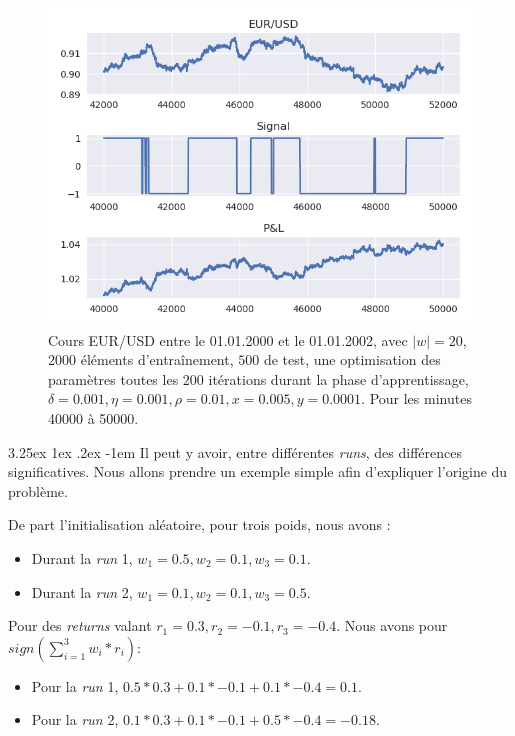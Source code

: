 \documentclass[a4paper, 11pt]{article}
\makeatletter
\renewcommand\paragraph{\@startsection{paragraph}{5}{\z@}%
  {3.25ex \@plus1ex \@minus.2ex}%
  {-1em}%
  {\normalfont\normalsize\bfseries}}
\makeatother
\begin{document}
 \begin{figure}[H]
	\centering
	\includegraphics[scale=0.85]{images/res/eursud_2000-2001_from_40000to_50000}
	\caption[Blup]{Cours EUR/USD entre le 01.01.2000 et le 01.01.2002, avec $|w| = 20$, $2000$ éléments d'entraînement, $500$ de test, une optimisation des
		paramètres toutes les $200$ itérations durant la phase d'apprentissage, $\delta = 0.001, \eta=0.001,\rho=0.01, x = 0.005, y=0.0001$. Pour les minutes 40000 à 50000.}
\end{figure}


\paragraph{}
Il peut y avoir, entre différentes \textit{runs}, des différences significatives. Nous allons prendre un exemple simple afin d'expliquer l'origine du problème.

De part l'initialisation aléatoire, pour trois poids, nous avons :
\begin{itemize}
	\item Durant la \textit{run} 1, $w_1=0.5,w_2=0.1,w_3=0.1$.
	\item Durant la \textit{run} 2, $w_1=0.1,w_2=0.1,w_3=0.5$.
\end{itemize}

Pour des \textit{returns} valant $r_1=0.3,r_2=-0.1,r_3=-0.4$. Nous avons pour $sign(\sum_{i=1}^{3}w_i * r_i)$:
\begin{itemize}
	\item Pour la \textit{run} 1, $0.5 * 0.3 + 0.1 * -0.1 + 0.1 * -0.4 = 0.1$.
	\item Pour la \textit{run} 2, $0.1 * 0.3 + 0.1 * -0.1 + 0.5 * -0.4 = -0.18$.
\end{itemize}
\end{document}
